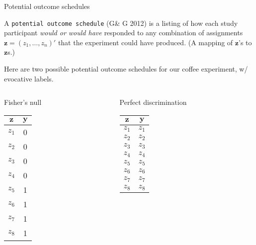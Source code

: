 \begin{frame}{Potential outcome schedules}
  
  A \texttt{potential outcome schedule} (G\& G 2012) is a listing of how each study participant \textit{would or would have} responded to any combination of assignments $\mathbf{z} = (z_1, \ldots, z_n)'$ that the experiment could have produced.   (A mapping of $\mathbf{z}$'s to $\mathbf{z}$s.)   


Here are two possible potential outcome schedules for our coffee experiment, w/ evocative labels.
\begin{columns}
  \begin{Column}
\hspace{1em}    { Fisher's null} \\
    \begin{tabular}{cc} \hline
 $\mathbf{z}$ & $\mathbf{y}$ \\ \hline
$z_1$ &  0   \\
$z_2$ &  0   \\
$z_3$ &  0   \\
$z_4$ &  0   \\
$z_5$ &  1   \\
$z_6$ &  1   \\
$z_7$ &  1   \\
$z_8$ &  1   \\ \hline
    \end{tabular}

  \end{Column}
  \begin{Column}
\hspace{1em}   { Perfect discrimination} \\
    \begin{tabular}{cc} \hline
 $\mathbf{z}$ & $\mathbf{y}$ \\ \hline
$z_1$ & $z_1$  \\
$z_2$ & $z_2$  \\
$z_3$ & $z_3$  \\
$z_4$ & $z_4$  \\
$z_5$ & $z_5$  \\
$z_6$ & $z_6$  \\
$z_7$ & $z_7$  \\
$z_8$ & $z_8$  \\ \hline
    \end{tabular}

  \end{Column}

\end{columns}

\end{frame}

